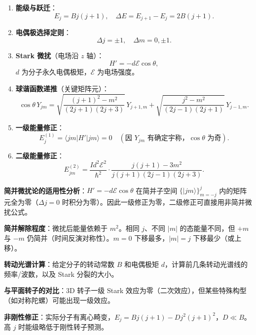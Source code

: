 \begin{formulabox}[核心公式]
\begin{enumerate}[label=\textbf{(\arabic*)}]
    \item \textbf{能级与跃迁}：
    \[
    E_j=Bj(j+1),\quad\Delta E=E_{j+1}-E_j=2B(j+1).
    \]

    \item \textbf{电偶极选择定则}：
    \[
    \Delta j=\pm1,\quad\Delta m=0,\pm1.
    \]

    \item \textbf{Stark 微扰}（电场沿 $z$ 轴）：
    \[
    H'=-d\mathcal{E}\cos\theta,
    \]
    $d$ 为分子永久电偶极矩，$\mathcal{E}$ 为电场强度。

    \item \textbf{球谐函数递推}（关键矩阵元）：
    \[
    \cos\theta\,Y_{jm}=\sqrt{\frac{(j+1)^2-m^2}{(2j+1)(2j+3)}}\,Y_{j+1,m}
    +\sqrt{\frac{j^2-m^2}{(2j-1)(2j+1)}}\,Y_{j-1,m}.
    \]

    \item \textbf{一级能量修正}：
    \[
    E_j^{(1)}=\langle jm|H'|jm\rangle=0\quad(\text{因 }Y_{jm}\text{ 有确定宇称，}\cos\theta\text{ 为奇}).
    \]

    \item \textbf{二级能量修正}：
    \[
    E_{jm}^{(2)}=\frac{Id^2\mathcal{E}^2}{\hbar^2}\cdot\frac{j(j+1)-3m^2}{j(j+1)(2j-1)(2j+3)}.
    \]
\end{enumerate}
\end{formulabox}

\begin{drillbox}[训练点与考法变体]
 \textbf{简并微扰论的适用性分析}：$H'=-d\mathcal{E}\cos\theta$ 在简并子空间 $\{|jm\rangle\}_{m=-j}^j$ 内的矩阵元全为零（$\Delta j=0$ 时积分为零）。因此一级修正为零，二级修正可直接用非简并微扰公式。

 \textbf{简并解除程度}：微扰后能量依赖于 $m^2$。相同 $j$、不同 $|m|$ 的态能量不同，但 $+m$ 与 $-m$ 仍简并（时间反演对称性）。$m=0$ 下移最多，$|m|=j$ 下移最少（或上移）。

 \textbf{转动光谱计算}：给定分子的转动常数 $B$ 和电偶极矩 $d$，计算前几条转动光谱线的频率/波数，以及 Stark 分裂的大小。

 \textbf{与平面转子的对比}：3D 转子一级 Stark 效应为零（二次效应），但某些特殊构型（如对称陀螺）可能出现一级效应。

 \textbf{非刚性修正}：实际分子有离心畸变，$E_j=Bj(j+1)-Dj^2(j+1)^2$，$D\ll B$。高 $j$ 时能级略低于刚性转子预测。
\end{drillbox}

